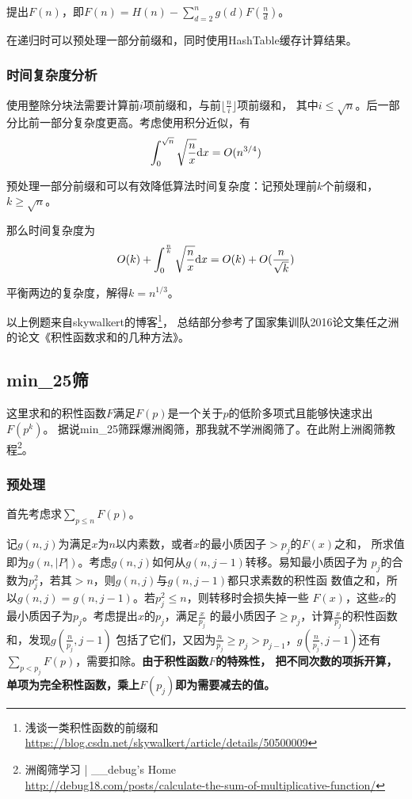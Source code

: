 提出$F(n)$，即$F(n)=H(n)-\displaystyle \sum_{d=2}^n{g(d)F(\frac{n}{d})}$。

在递归时可以预处理一部分前缀和，同时使用HashTable缓存计算结果。
\subsubsection{时间复杂度分析}
使用整除分块法需要计算前$i$项前缀和，与前$\lfloor\frac{n}{i} \rfloor$项前缀和，
其中$i\leq \sqrt{n}$。后一部分比前一部分复杂度更高。考虑使用积分近似，有
\begin{displaymath}
    \int_0^{\sqrt{n}}{\sqrt{\frac{n}{x}} \textrm{d} x}=O(n^{3/4})
\end{displaymath}

预处理一部分前缀和可以有效降低算法时间复杂度：记预处理前$k$个前缀和，$k\geq \sqrt{n}$。

那么时间复杂度为
\begin{displaymath}
    O(k)+\int_0^{\frac{n}{k}}{\sqrt{\frac{n}{x}}\textrm{d} x}=O(k)+O(\frac{n}{\sqrt{k}})
\end{displaymath}

平衡两边的复杂度，解得$k=n^{1/3}$。

以上例题来自skywalkert的博客\footnote{浅谈一类积性函数的前缀和\\
    \url{https://blog.csdn.net/skywalkert/article/details/50500009}}，
总结部分参考了国家集训队2016论文集任之洲的论文《积性函数求和的几种方法》。

\subsection{min\_25筛}
这里求和的积性函数$F$满足$F(p)$是一个关于$p$的低阶多项式且能够快速求出$F(p^k)$。
据说min\_25筛踩爆洲阁筛，那我就不学洲阁筛了。在此附上洲阁筛教程\footnote{
    洲阁筛学习 | \_\_debug's Home\\
    \url{http://debug18.com/posts/calculate-the-sum-of-multiplicative-function/}
}。

\subsubsection{预处理}
首先考虑求$\displaystyle \sum_{p\leq n}{F(p)}$。

记$g(n,j)$为满足$x$为$n$以内素数，或者$x$的最小质因子$>p_j$的$F(x)$之和，
所求值即为$g(n,|P|)$。考虑$g(n,j)$如何从$g(n,j-1)$转移。易知最小质因子为
$p_j$的合数为$p_j^2$，若其$>n$，则$g(n,j)$与$g(n,j-1)$都只求素数的积性函
数值之和，所以$g(n,j)=g(n,j-1)$。若$p_j^2\leq n$，则转移时会损失掉一些
$F(x)$，这些$x$的最小质因子为$p_j$。考虑提出$x$的$p_j$，满足$\frac{x}{p_j}$
的最小质因子$\geq p_j$，计算$\frac{x}{p_j}$的积性函数和，发现$g(\frac{n}{p_j},j-1)$
包括了它们，又因为$\frac{n}{p_j}\geq p_j > p_{j-1}$，$g(\frac{n}{p_j},j-1)$还有
$\displaystyle \sum_{p<p_j}F(p)$，需要扣除。{\bfseries 由于积性函数$F$的特殊性，
把不同次数的项拆开算，单项为完全积性函数，乘上$F(p_j)$即为需要减去的值。}

